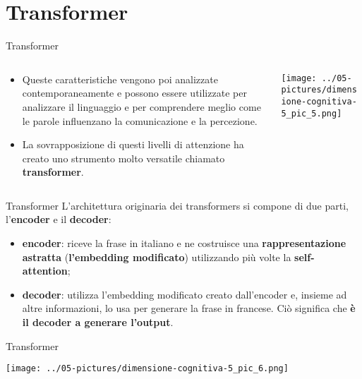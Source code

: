 \documentclass[aspectratio=169]{beamer}
\begin{document}
\section{Transformer}
%
%
\begin{frame}{Transformer}
\begin{columns}[T] %
\begin{column}{.48\textwidth}
\vspace{1cm}
        \begin{itemize}
\item Queste caratteristiche vengono poi analizzate contemporaneamente e possono essere utilizzate per analizzare il linguaggio e per comprendere meglio come le parole influenzano la comunicazione e la percezione. 
\item La sovrapposizione di questi livelli di attenzione ha creato uno strumento molto versatile chiamato \textbf{transformer}.
        \end{itemize}
\end{column}%
\hfill%
\begin{column}{.48\textwidth}
        \texttt{[image: ../05-pictures/dimensione-cognitiva-5\_pic\_5.png]}
\end{column}%
\end{columns}
\end{frame}
%
%
\begin{frame}{Transformer}
L’architettura originaria dei transformers si compone di due parti, l’\textbf{encoder} e il \textbf{decoder}:
\begin{itemize}
\item \textbf{encoder}: riceve la frase in italiano e ne costruisce una \textbf{rappresentazione astratta} (\textbf{l’embedding modificato}) utilizzando più volte la \textbf{self-attention};
\item \textbf{decoder}: utilizza l’embedding modificato creato dall’encoder e, insieme ad altre informazioni, lo usa per generare la frase in francese. Ciò significa che \textbf{è il decoder a generare l’output}.
\end{itemize}
\end{frame}
%
%
\begin{frame}{Transformer}
\begin{center}
\texttt{[image: ../05-pictures/dimensione-cognitiva-5\_pic\_6.png]} 
\end{center}
\end{frame}
\end{document}
